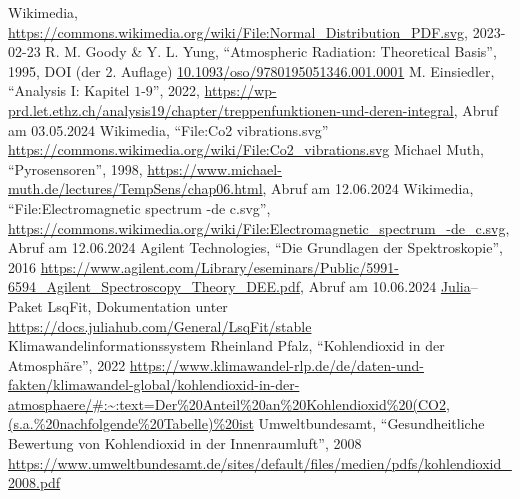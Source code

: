 \documentclass[12pt,a4paper]{scrartcl}
\numberwithin{equation}{section} %
\newcommand{\code}[1]{\textsf{#1}}
\begin{document}
\begin{thebibliography}{9}
  Wikimedia,
  \url{https://commons.wikimedia.org/wiki/File:Normal_Distribution_PDF.svg},
  2023-02-23
  R. M. Goody \& Y. L. Yung, ``Atmospheric Radiation: Theoretical Basis'', 1995,
  DOI  (der 2. Auflage) \href{https://doi.org/10.1093/oso/9780195051346.001.0001}{10.1093/oso/9780195051346.001.0001}
  M. Einsiedler, ``Analysis I: Kapitel $1$-$9$'', 2022,
  \url{https://wp-prd.let.ethz.ch/analysis19/chapter/treppenfunktionen-und-deren-integral},
  Abruf am 03.05.2024
  Wikimedia, ``File:Co2 vibrations.svg''
  \url{https://commons.wikimedia.org/wiki/File:Co2_vibrations.svg}
  Michael Muth, ``Pyrosensoren'', 1998,
  \url{https://www.michael-muth.de/lectures/TempSens/chap06.html}, Abruf am 12.06.2024
  Wikimedia, ``File:Electromagnetic spectrum -de c.svg'',
  \url{https://commons.wikimedia.org/wiki/File:Electromagnetic_spectrum_-de_c.svg}, Abruf am 12.06.2024
  Agilent Technologies, ``Die Grundlagen der Spektroskopie'', 2016
  \url{https://www.agilent.com/Library/eseminars/Public/5991-6594_Agilent_Spectroscopy_Theory_DEE.pdf},
  Abruf am 10.06.2024
  \code{\href{https://julialang.org}{Julia}}--Paket \code{LsqFit},
  Dokumentation unter \url{https://docs.juliahub.com/General/LsqFit/stable}
  Klimawandelinformationssystem Rheinland Pfalz, ``Kohlendioxid in der Atmosphäre'', 2022
  \url{https://www.klimawandel-rlp.de/de/daten-und-fakten/klimawandel-global/kohlendioxid-in-der-atmosphaere/#:~:text=Der%20Anteil%20an%20Kohlendioxid%20(CO2,(s.a.%20nachfolgende%20Tabelle)%20ist}
  Umweltbundesamt, ``Gesundheitliche Bewertung
  von Kohlendioxid in der
  Innenraumluft'', 2008
  \url{https://www.umweltbundesamt.de/sites/default/files/medien/pdfs/kohlendioxid_2008.pdf}
\end{thebibliography}
\end{document}
